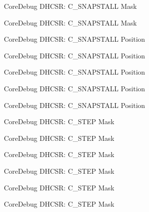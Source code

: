 \begin{DoxyRefList}
\label{deprecated__deprecated000394}%
%
Core\+Debug D\+H\+C\+SR\+: C\+\_\+\+S\+N\+A\+P\+S\+T\+A\+LL Mask 

\label{deprecated__deprecated000483}%
%
Core\+Debug D\+H\+C\+SR\+: C\+\_\+\+S\+N\+A\+P\+S\+T\+A\+LL Mask  
\item[Member \mbox{\hyperlink{group__CMSIS__CoreDebug_ga85747214e2656df6b05ec72e4d22bd6d}{Core\+Debug\+\_\+\+D\+H\+C\+S\+R\+\_\+\+C\+\_\+\+S\+N\+A\+P\+S\+T\+A\+L\+L\+\_\+\+Pos}} ]\label{deprecated__deprecated000031}%
%
Core\+Debug D\+H\+C\+SR\+: C\+\_\+\+S\+N\+A\+P\+S\+T\+A\+LL Position 

\label{deprecated__deprecated000175}%
%
Core\+Debug D\+H\+C\+SR\+: C\+\_\+\+S\+N\+A\+P\+S\+T\+A\+LL Position 

\label{deprecated__deprecated000317}%
%
Core\+Debug D\+H\+C\+SR\+: C\+\_\+\+S\+N\+A\+P\+S\+T\+A\+LL Position 

\label{deprecated__deprecated000393}%
%
Core\+Debug D\+H\+C\+SR\+: C\+\_\+\+S\+N\+A\+P\+S\+T\+A\+LL Position 

\label{deprecated__deprecated000482}%
%
Core\+Debug D\+H\+C\+SR\+: C\+\_\+\+S\+N\+A\+P\+S\+T\+A\+LL Position  
\item[Member \mbox{\hyperlink{group__CMSIS__CoreDebug_gae6bda72fbd32cc5734ff3542170dc00d}{Core\+Debug\+\_\+\+D\+H\+C\+S\+R\+\_\+\+C\+\_\+\+S\+T\+E\+P\+\_\+\+Msk}} ]\label{deprecated__deprecated000036}%
%
Core\+Debug D\+H\+C\+SR\+: C\+\_\+\+S\+T\+EP Mask 

\label{deprecated__deprecated000124}%
%
Core\+Debug D\+H\+C\+SR\+: C\+\_\+\+S\+T\+EP Mask 

\label{deprecated__deprecated000180}%
%
Core\+Debug D\+H\+C\+SR\+: C\+\_\+\+S\+T\+EP Mask 

\label{deprecated__deprecated000263}%
%
Core\+Debug D\+H\+C\+SR\+: C\+\_\+\+S\+T\+EP Mask 

\label{deprecated__deprecated000322}%
%
Core\+Debug D\+H\+C\+SR\+: C\+\_\+\+S\+T\+EP Mask 

\label{deprecated__deprecated000398}%
%
Core\+Debug D\+H\+C\+SR\+: C\+\_\+\+S\+T\+EP Mask 


\end{DoxyRefList}
